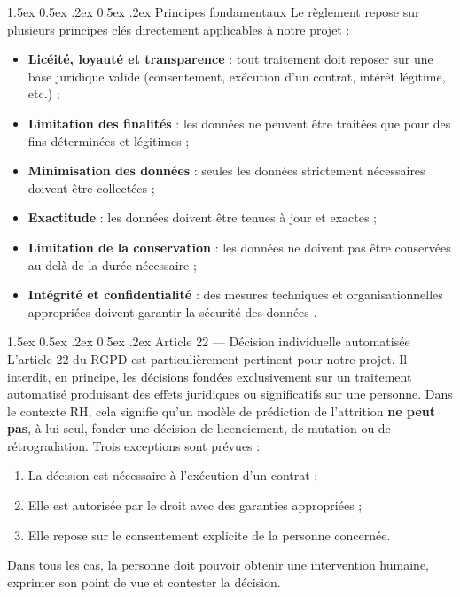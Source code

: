 \documentclass[12pt,a4paper]{article}
\makeatletter
\renewcommand\paragraph{\@startsection{paragraph}{4}{\z@}%
  {1.5ex \@plus 0.5ex \@minus .2ex}%
  {0.5ex \@plus .2ex}%
  {\normalfont\normalsize\bfseries}}
\makeatother
\begin{document}
\paragraph{Principes fondamentaux}
Le règlement repose sur plusieurs principes clés directement applicables à notre projet :
\begin{itemize}
    \item \textbf{Licéité, loyauté et transparence} : tout traitement doit reposer sur une base juridique valide (consentement, exécution d'un contrat, intérêt légitime, etc.) ;
    \item \textbf{Limitation des finalités} : les données ne peuvent être traitées que pour des fins déterminées et légitimes ;
    \item \textbf{Minimisation des données} : seules les données strictement nécessaires doivent être collectées ;
    \item \textbf{Exactitude} : les données doivent être tenues à jour et exactes ;
    \item \textbf{Limitation de la conservation} : les données ne doivent pas être conservées au-delà de la durée nécessaire ;
    \item \textbf{Intégrité et confidentialité} : des mesures techniques et organisationnelles appropriées doivent garantir la sécurité des données \cite{cnil_securite}.
\end{itemize}

\paragraph{Article 22 --- Décision individuelle automatisée}
L'article 22 du RGPD est particulièrement pertinent pour notre projet. Il interdit, en principe, les décisions fondées exclusivement sur un traitement automatisé produisant des effets juridiques ou significatifs sur une personne. Dans le contexte RH, cela signifie qu'un modèle de prédiction de l'attrition \textbf{ne peut pas}, à lui seul, fonder une décision de licenciement, de mutation ou de rétrogradation. Trois exceptions sont prévues :
\begin{enumerate}
    \item La décision est nécessaire à l'exécution d'un contrat ;
    \item Elle est autorisée par le droit avec des garanties appropriées ;
    \item Elle repose sur le consentement explicite de la personne concernée.
\end{enumerate}
Dans tous les cas, la personne doit pouvoir obtenir une intervention humaine, exprimer son point de vue et contester la décision.
\end{document}
